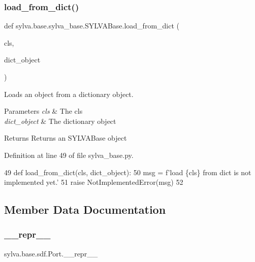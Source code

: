 \subsubsection{\texorpdfstring{load\+\_\+from\+\_\+dict()}{load\_from\_dict()}}
{\footnotesize\ttfamily def sylva.\+base.\+sylva\+\_\+base.\+S\+Y\+L\+V\+A\+Base.\+load\+\_\+from\+\_\+dict (\begin{DoxyParamCaption}\item[{}]{cls,  }\item[{}]{dict\+\_\+object }\end{DoxyParamCaption})\hspace{0.3cm}{\ttfamily [inherited]}}



Loads an object from a dictionary object. 


\begin{DoxyParams}{Parameters}
{\em cls} & The cls \\
\hline
{\em dict\+\_\+object} & The dictionary object\\
\hline
\end{DoxyParams}
\begin{DoxyReturn}{Returns}
Returns an S\+Y\+L\+V\+A\+Base object 
\end{DoxyReturn}


Definition at line 49 of file sylva\+\_\+base.\+py.


\begin{DoxyCode}
49     \textcolor{keyword}{def }load\_from\_dict(cls, dict\_object):
50         msg = f\textcolor{stringliteral}{'load \{cls\} from dict is not implemented yet.'}
51         \textcolor{keywordflow}{raise} NotImplementedError(msg)
52 
\end{DoxyCode}


\subsection{Member Data Documentation}
\mbox{\label{classsylva_1_1base_1_1sdf_1_1_port_a1d6e4ff7796c0ecdd2fc39b12fb15494}} 
\subsubsection{\texorpdfstring{\+\_\+\+\_\+repr\+\_\+\+\_\+}{\_\_repr\_\_}}
{\footnotesize\ttfamily sylva.\+base.\+sdf.\+Port.\+\_\+\+\_\+repr\+\_\+\+\_\+\hspace{0.3cm}{\ttfamily [private]}}



